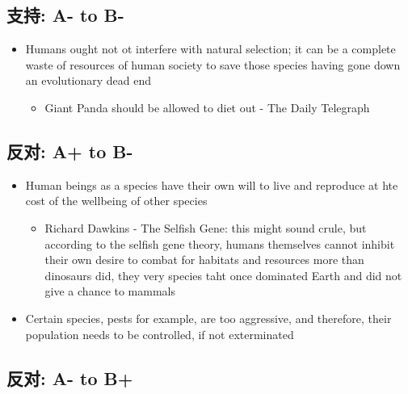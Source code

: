 \documentclass{article}
\begin{document}
    \subsection{支持: A- to B-}

      \begin{itemize}
        \item Humans ought not ot interfere with natural selection; it can
        be a complete waste of resources of human society to save those species
        having gone down an evolutionary dead end
        \begin{itemize}
          \item Giant Panda should be allowed to diet out - The Daily Telegraph
        \end{itemize}
      \end{itemize}

    \subsection{反对: A+ to B-}

      \begin{itemize}
        \item Human beings as a species have their own will to live and
        reproduce at hte cost of the wellbeing of other species
        \begin{itemize}
          \item Richard Dawkins - The Selfish Gene: this might sound crule,
          but according to the selfish gene theory, humans themselves cannot
          inhibit their own desire to combat for habitats and resources more
          than dinosaurs did, they very species taht once dominated Earth and
          did not give a chance to mammals
        \end{itemize}

        \item Certain species, pests for example, are too aggressive, and
        therefore, their population needs to be controlled, if not
        exterminated
      \end{itemize}

    \subsection{反对: A- to B+}
\end{document}
